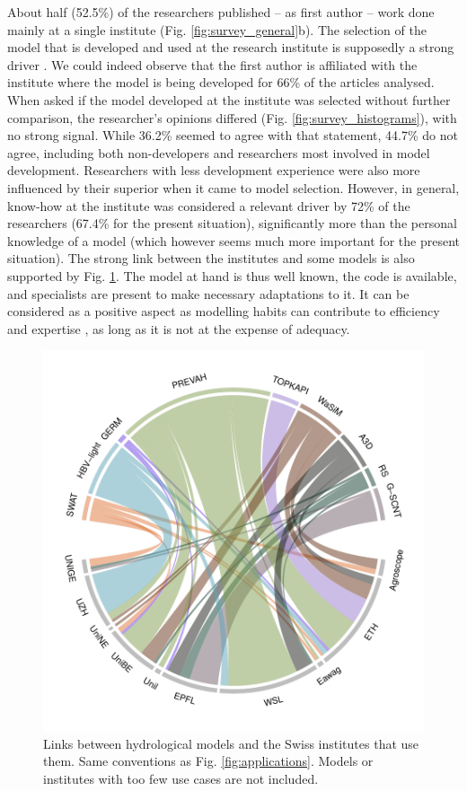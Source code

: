 \documentclass[10pt,a4paper]{article}
\begin{document}
About half (52.5\%) of the researchers published -- as first author -- work done mainly at a single institute (Fig. \ref{fig:survey_general}b). The selection of the model that is developed and used at the research institute is supposedly a strong driver \citep{Addor2019}. We could indeed observe that the first author is affiliated with the institute where the model is being developed for 66\% of the articles analysed. When asked if the model developed at the institute was selected without further comparison, the researcher's opinions differed (Fig. \ref{fig:survey_histograms}), with no strong signal. While 36.2\% seemed to agree with that statement, 44.7\% do not agree, including both non-developers and researchers most involved in model development. Researchers with less development experience were also more influenced by their superior when it came to model selection. However, in general, know-how at the institute was considered a relevant driver by 72\% of the researchers (67.4\% for the present situation), significantly more than the personal knowledge of a model (which however seems much more important for the present situation). The strong link between the institutes and some models is also supported by Fig. \ref{fig:model-institutes}. The model at hand is thus well known, the code is available, and specialists are present to make necessary adaptations to it. It can be considered as a positive aspect as modelling habits can contribute to efficiency and expertise \citep{Babel2019}, as long as it is not at the expense of adequacy.

\begin{figure}[htb]
	\begin{center}
		\includegraphics[width=0.70\columnwidth]{figures/chord_diagram_institutes}
		\caption{{Links between hydrological models and the Swiss institutes that use them. Same conventions as Fig. \ref{fig:applications}. Models or institutes with too few use cases are not included.
		{\label{fig:model-institutes}}
		}}
	\end{center}
\end{figure}
\end{document}
